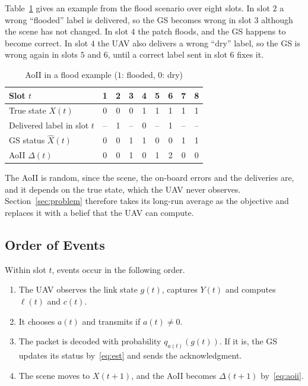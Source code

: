 \documentclass[journal]{IEEEtran}
\theoremstyle{remark}
\newcommand{\lab}{\ell}
\begin{document}
Table~\ref{tab:aoiiex} gives an example from the flood scenario over eight slots. In slot $2$ a wrong ``flooded'' label is delivered, so the GS becomes wrong in slot $3$ although the scene has not changed. In slot $4$ the patch floods, and the GS happens to become correct. In slot $4$ the UAV also delivers a wrong ``dry'' label, so the GS is wrong again in slots $5$ and $6$, until a correct label sent in slot $6$ fixes it.

\begin{table}[t]
\caption{AoII in a flood example ($1$: flooded, $0$: dry)}\label{tab:aoiiex}
\centering\footnotesize
\setlength{\tabcolsep}{5pt}
\begin{tabular}{@{}lcccccccc@{}}
\toprule
Slot $t$ & 1 & 2 & 3 & 4 & 5 & 6 & 7 & 8\\
\midrule
True state $X(t)$ & 0 & 0 & 0 & 1 & 1 & 1 & 1 & 1\\
Delivered label in slot $t$ & -- & 1 & -- & 0 & -- & 1 & -- & --\\
GS status $\hat X(t)$ & 0 & 0 & 1 & 1 & 0 & 0 & 1 & 1\\
AoII $\Delta(t)$ & 0 & 0 & 1 & 0 & 1 & 2 & 0 & 0\\
\bottomrule
\end{tabular}
\end{table}

The AoII is random, since the scene, the on-board errors and the deliveries are, and it depends on the true state, which the UAV never observes. Section~\ref{sec:problem} therefore takes its long-run average as the objective and replaces it with a belief that the UAV can compute.

\subsection{Order of Events}\label{sec:events}
Within slot $t$, events occur in the following order.
\begin{enumerate}
\item The UAV observes the link state $g(t)$, captures $Y(t)$ and computes $\lab(t)$ and $c(t)$.
\item It chooses $a(t)$ and transmits if $a(t)\neq0$.
\item The packet is decoded with probability $q_{a(t)}(g(t))$. If it is, the GS updates its status by~\eqref{eq:est} and sends the acknowledgment.
\item The scene moves to $X(t+1)$, and the AoII becomes $\Delta(t+1)$ by~\eqref{eq:aoii}.
\end{enumerate}
\end{document}
